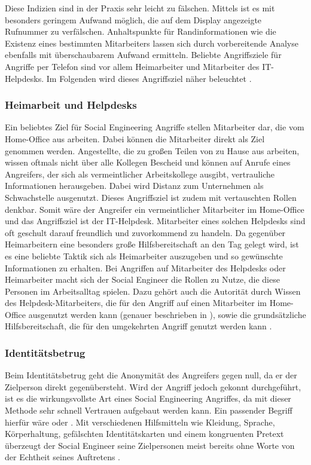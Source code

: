 Diese Indizien sind in der Praxis sehr leicht zu fälschen. Mittels  ist es mit besonders geringem Aufwand möglich, die auf dem Display angezeigte Rufnummer zu verfälschen.
Anhaltspunkte für Randinformationen wie die Existenz eines bestimmten Mitarbeiters lassen sich durch vorbereitende Analyse ebenfalls mit überschaubarem Aufwand ermitteln.
Beliebte Angriffsziele für Angriffe per Telefon sind vor allem Heimarbeiter und Mitarbeiter des IT-Helpdesks.
Im Folgenden wird dieses Angriffsziel näher beleuchtet \citep{hadnagy}.


\subsubsection{Heimarbeit und Helpdesks}\label{sec:heimarbeitundhelpdesks}
Ein beliebtes Ziel für Social Engineering Angriffe stellen Mitarbeiter dar, die vom Home-Office aus
arbeiten.
Dabei können die Mitarbeiter direkt als Ziel genommen werden.
Angestellte, die zu großen Teilen von zu Hause aus arbeiten, wissen oftmals nicht über alle Kollegen Bescheid und können auf Anrufe eines Angreifers, der sich als vermeintlicher Arbeitskollege ausgibt, vertrauliche Informationen herausgeben.
Dabei wird Distanz zum Unternehmen als Schwachstelle ausgenutzt.
Dieses Angriffsziel ist zudem mit vertauschten Rollen denkbar.
Somit wäre der Angreifer ein vermeintlicher Mitarbeiter im Home-Office und das Angriffsziel ist der IT-Helpdesk.
Mitarbeiter eines solchen Helpdesks sind oft geschult darauf freundlich und zuvorkommend zu handeln.
Da gegenüber Heimarbeitern eine besonders große Hilfsbereitschaft an den Tag gelegt wird, ist es eine
beliebte Taktik sich als Heimarbeiter auszugeben und so gewünschte Informationen zu erhalten. 
Bei Angriffen auf Mitarbeiter des Helpdesks oder Heimarbeiter macht sich der Social Engineer die Rollen zu Nutze, die diese Personen im Arbeitsalltag spielen.
Dazu gehört auch die Autorität durch Wissen des Helpdesk-Mitarbeiters, die für den Angriff auf einen Mitarbeiter im Home-Office ausgenutzt werden kann (genauer beschrieben in ), sowie die grundsätzliche Hilfsbereitschaft, die für den umgekehrten Angriff genutzt werden kann \citep{hacking-the-human}.


\subsubsection{Identitätsbetrug}\label{sec:identitätsbetrug}
Beim Identitätsbetrug geht die Anonymität des Angreifers gegen null, da er der Zielperson direkt gegenübersteht. Wird der Angriff jedoch gekonnt durchgeführt, ist es die wirkungsvollste Art eines Social Engineering Angriffes, da mit dieser Methode sehr schnell Vertrauen aufgebaut werden kann.
Ein passender Begriff hierfür wäre  oder .
Mit verschiedenen Hilfsmitteln wie Kleidung, Sprache, Körperhaltung, gefälschten Identitätskarten und einem kongruenten Pretext überzeugt der Social Engineer seine Zielpersonen meist bereits ohne Worte von der Echtheit seines Auftretens \citep{hadnagy}.

